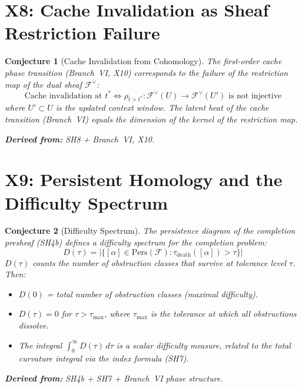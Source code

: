 \documentclass[11pt,letterpaper]{article}
\newtheorem{conjecture}{Conjecture}[section]
\newcommand{\sheaf}{\mathcal{F}}
\begin{document}
\section{X8: Cache Invalidation as Sheaf Restriction Failure}

\begin{conjecture}[Cache Invalidation from 
Cohomology]\label{conj:x_cache}
The first-order cache phase transition (Branch~VI, X10) corresponds 
to the failure of the restriction map of the dual sheaf 
$\sheaf^\vee$:
\begin{equation}\label{eq:cache_invalidation}
    \text{Cache invalidation at } t^* \iff 
    \rho_{t > t^*} : \sheaf^\vee(U) \to \sheaf^\vee(U') 
    \text{ is not injective}
\end{equation}
where $U' \subset U$ is the updated context window. The latent heat 
of the cache transition (Branch~VI) equals the dimension of the kernel 
of the restriction map.

\textbf{Derived from:} SH8 + Branch~VI, X10.
\end{conjecture}

\section{X9: Persistent Homology and the Difficulty Spectrum}

\begin{conjecture}[Difficulty Spectrum]\label{conj:x_difficulty}
The persistence diagram of the completion presheaf (SH4b) defines a 
\emph{difficulty spectrum} for the completion problem:
\begin{equation}\label{eq:difficulty}
    D(\tau) = |\{[\alpha] \in \mathrm{Pers}(\sheaf) : 
    \tau_{\mathrm{death}}([\alpha]) > \tau\}|
\end{equation}
$D(\tau)$ counts the number of obstruction classes that survive at 
tolerance level $\tau$. Then:
\begin{itemize}
    \item $D(0)$ = total number of obstruction classes (maximal 
    difficulty).
    \item $D(\tau) = 0$ for $\tau > \tau_{\max}$, where 
    $\tau_{\max}$ is the tolerance at which all obstructions dissolve.
    \item The integral $\int_0^\infty D(\tau) \, d\tau$ is a scalar 
    difficulty measure, related to the total curvature integral 
    via the index formula (SH7).
\end{itemize}

\textbf{Derived from:} SH4b + SH7 + Branch~VI phase structure.
\end{conjecture}
\end{document}
